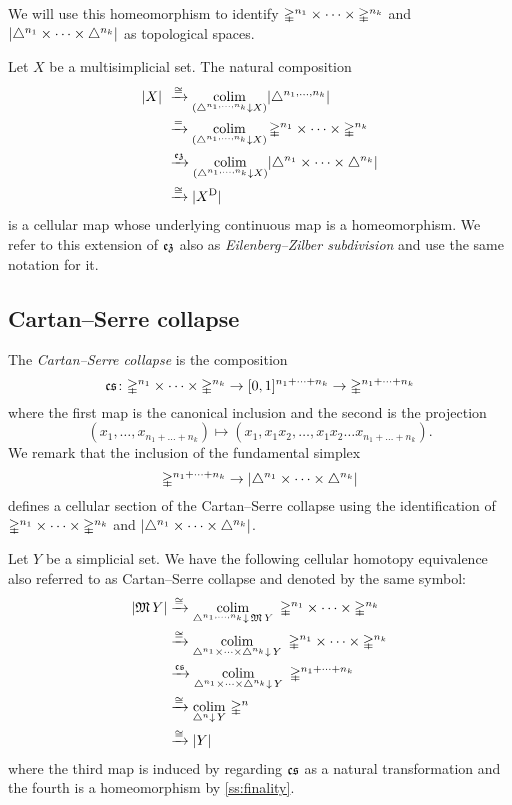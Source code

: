 We will use this homeomorphism to identify $\mathbb{\Delta}^{n_1} \times \dots \times \mathbb{\Delta}^{n_k}$ and $\lvert\triangle^{n_1} \times \dots \times \triangle^{n_k}\rvert$ as topological spaces.

Let $X$ be a multisimplicial set.
The natural composition
\begin{align*}
	\lvert X\rvert \ &\xrightarrow{\cong}
	\operatorname*{colim}_{(\triangle^{n_1, \dots, n_k} \downarrow X)} \lvert\triangle^{n_1, \dots, n_k}\rvert \\ &\xrightarrow{=}
	\operatorname*{colim}_{(\triangle^{n_1, \dots, n_k} \downarrow X)} \mathbb{\Delta}^{n_1} \times \dots \times \mathbb{\Delta}^{n_k} \\ &\xrightarrow{\operatorname{\mathfrak{ez}}}
	\operatorname*{colim}_{(\triangle^{n_1, \dots, n_k} \downarrow X)} \lvert\triangle^{n_1} \times \dots \times \triangle^{n_k}\rvert \\ &\xrightarrow{\cong}
	\lvert X^{\mathrm{D}}\rvert
\end{align*}
is a cellular map whose underlying continuous map is a homeomorphism.
We refer to this extension of $\operatorname{\mathfrak{ez}}$ also as \textit{Eilenberg--Zilber subdivision} and use the same notation for it.

\subsection{Cartan--Serre collapse} \label{ss:cartan-serre map}

The \textit{Cartan--Serre collapse} is the composition
\[
\operatorname{\mathfrak{cs}} \colon
\mathbb{\Delta}^{n_1} \times \dots \times \mathbb{\Delta}^{n_k} \to
[0,1]^{n_1 + \dots + n_k} \to
\mathbb{\Delta}^{n_1 + \dots + n_k}
\]
where the first map is the canonical inclusion and the second is the projection
\[
(x_1, \dots, x_{n_1 + \dots + n_k}) \mapsto (x_1, x_1x_2, \dots, x_1x_2 \dots x_{n_1 + \dots + n_k}).
\]
We remark that the inclusion of the fundamental simplex
\[
\mathbb{\Delta}^{n_1 + \dots + n_k} \to \lvert\triangle^{n_1} \times \dots \times \triangle^{n_k}\rvert
\]
defines a cellular section of the Cartan--Serre collapse using the identification of $\mathbb{\Delta}^{n_1} \times \dots \times \mathbb{\Delta}^{n_k}$ and $\lvert\triangle^{n_1} \times \dots \times \triangle^{n_k}\rvert$.

Let $Y$ be a simplicial set.
We have the following cellular homotopy equivalence also referred to as Cartan--Serre collapse and denoted by the same symbol:
\[
\begin{split}
\lvert\operatorname{\mathfrak{M}} Y\rvert & \xrightarrow{\cong}
\operatorname*{colim}_{\triangle^{n_1, \dots, n_k} \downarrow \, \operatorname{\mathfrak{M}} Y} \
\mathbb{\Delta}^{n_1} \times \cdots \times \mathbb{\Delta}^{n_k} \\ & \xrightarrow{\cong}
\operatorname*{colim}_{\triangle^{n_1} \times \dots \times \triangle^{n_k} \downarrow \, Y} \
\mathbb{\Delta}^{n_1} \times \cdots \times \mathbb{\Delta}^{n_k} \\ & \xrightarrow{\operatorname{\mathfrak{cs}}}
\operatorname*{colim}_{\triangle^{n_1} \times \dots \times \triangle^{n_k} \downarrow \, Y} \
\mathbb{\Delta}^{n_1 + \dots + n_k} \\ & \xrightarrow{\cong}
\operatorname*{colim}_{\triangle^{n} \downarrow \, Y} \,
\mathbb{\Delta}^{n} \\ & \xrightarrow{\cong}
\lvert Y\rvert
\end{split}
\]
where the third map is induced by regarding $\operatorname{\mathfrak{cs}}$ as a natural transformation and the fourth is a homeomorphism by \cref{ss:finality}.

